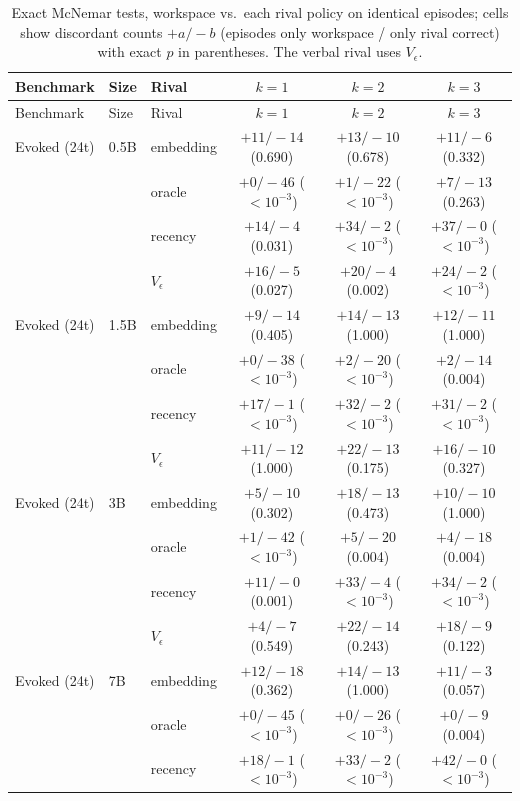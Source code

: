 {\scriptsize
\setlength{\tabcolsep}{4pt}
\begin{longtable}{lllccc}
\caption{Exact McNemar tests, workspace vs.\ each rival policy on identical
episodes; cells show discordant counts $+a/-b$ (episodes only workspace / only
rival correct) with exact $p$ in parentheses. The verbal rival uses $V_\epsilon$.}
\label{tab:appA4} \\
\toprule
Benchmark & Size & Rival & $k{=}1$ & $k{=}2$ & $k{=}3$ \\
\midrule
\endfirsthead
\toprule
Benchmark & Size & Rival & $k{=}1$ & $k{=}2$ & $k{=}3$ \\
\midrule
\endhead
\bottomrule
\endfoot
Evoked (24t) & 0.5B & embedding & $+11/-14$ (0.690) & $+13/-10$ (0.678) & $+11/-6$ (0.332) \\
 &  & oracle & $+0/-46$ ($<\!10^{-3}$) & $+1/-22$ ($<\!10^{-3}$) & $+7/-13$ (0.263) \\
 &  & recency & $+14/-4$ (0.031) & $+34/-2$ ($<\!10^{-3}$) & $+37/-0$ ($<\!10^{-3}$) \\
 &  & $V_\epsilon$ & $+16/-5$ (0.027) & $+20/-4$ (0.002) & $+24/-2$ ($<\!10^{-3}$) \\
Evoked (24t) & 1.5B & embedding & $+9/-14$ (0.405) & $+14/-13$ (1.000) & $+12/-11$ (1.000) \\
 &  & oracle & $+0/-38$ ($<\!10^{-3}$) & $+2/-20$ ($<\!10^{-3}$) & $+2/-14$ (0.004) \\
 &  & recency & $+17/-1$ ($<\!10^{-3}$) & $+32/-2$ ($<\!10^{-3}$) & $+31/-2$ ($<\!10^{-3}$) \\
 &  & $V_\epsilon$ & $+11/-12$ (1.000) & $+22/-13$ (0.175) & $+16/-10$ (0.327) \\
Evoked (24t) & 3B & embedding & $+5/-10$ (0.302) & $+18/-13$ (0.473) & $+10/-10$ (1.000) \\
 &  & oracle & $+1/-42$ ($<\!10^{-3}$) & $+5/-20$ (0.004) & $+4/-18$ (0.004) \\
 &  & recency & $+11/-0$ (0.001) & $+33/-4$ ($<\!10^{-3}$) & $+34/-2$ ($<\!10^{-3}$) \\
 &  & $V_\epsilon$ & $+4/-7$ (0.549) & $+22/-14$ (0.243) & $+18/-9$ (0.122) \\
Evoked (24t) & 7B & embedding & $+12/-18$ (0.362) & $+14/-13$ (1.000) & $+11/-3$ (0.057) \\
 &  & oracle & $+0/-45$ ($<\!10^{-3}$) & $+0/-26$ ($<\!10^{-3}$) & $+0/-9$ (0.004) \\
 &  & recency & $+18/-1$ ($<\!10^{-3}$) & $+33/-2$ ($<\!10^{-3}$) & $+42/-0$ ($<\!10^{-3}$) \\

\end{longtable}}
